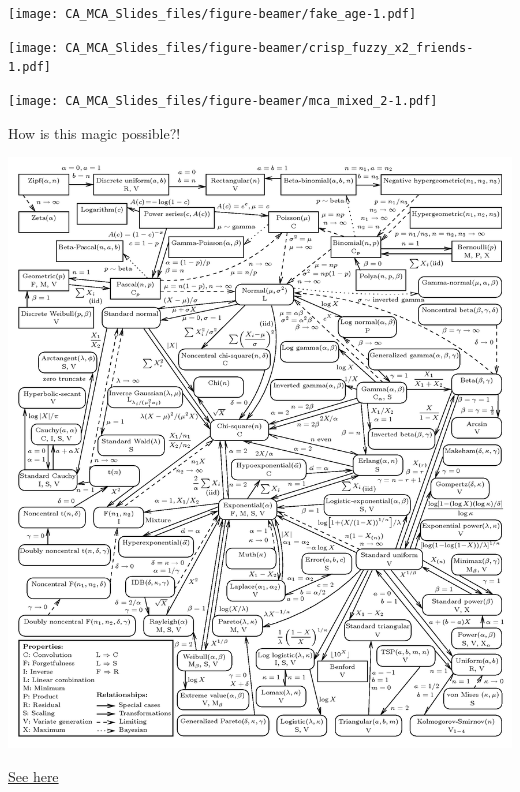 \documentclass[
  ignorenonframetext,
]{beamer}
\begin{document}
\begin{frame}

\texttt{[image: CA\_MCA\_Slides\_files/figure-beamer/fake\_age-1.pdf]}

\end{frame}

\begin{frame}

\texttt{[image: CA\_MCA\_Slides\_files/figure-beamer/crisp\_fuzzy\_x2\_friends-1.pdf]}

\end{frame}

\begin{frame}

\texttt{[image: CA\_MCA\_Slides\_files/figure-beamer/mca\_mixed\_2-1.pdf]}

\end{frame}

\begin{frame}{How is this magic possible?!}
\protect\hypertarget{how-is-this-magic-possible}{}

\end{frame}

\begin{frame}

\includegraphics[width=\textwidth,height=0.75\textheight]{../images/distributions.png}

\href{http://www.math.wm.edu/~leemis/chart/UDR/UDR.html}{See here}

\end{frame}
\end{document}
